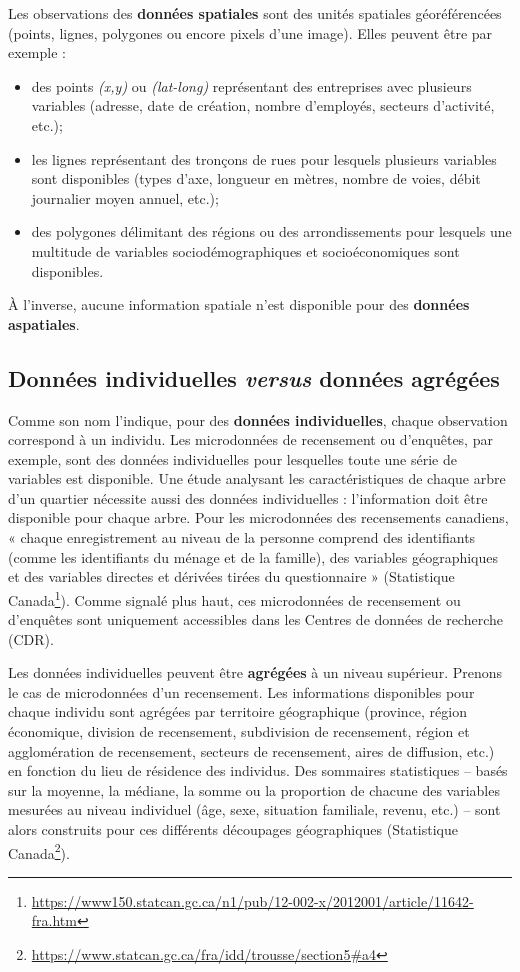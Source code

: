 \documentclass[
  11pt,
  french,
]{book}
\providecommand{\tightlist}{%
  \setlength{\itemsep}{0pt}\setlength{\parskip}{0pt}}
\renewcommand{\href}[2]{#2\footnote{\url{#1}}}
\begin{document}
Les observations des \textbf{données spatiales} sont des unités spatiales géoréférencées (points, lignes, polygones ou encore pixels d'une image). Elles peuvent être par exemple :

\begin{itemize}
\tightlist
\item
  des points \emph{(x,y)} ou \emph{(lat-long)} représentant des entreprises avec plusieurs variables (adresse, date de création, nombre d'employés, secteurs d'activité, etc.);
\item
  les lignes représentant des tronçons de rues pour lesquels plusieurs variables sont disponibles (types d'axe, longueur en mètres, nombre de voies, débit journalier moyen annuel, etc.);
\item
  des polygones délimitant des régions ou des arrondissements pour lesquels une multitude de variables sociodémographiques et socioéconomiques sont disponibles.
\end{itemize}

À l'inverse, aucune information spatiale n'est disponible pour des \textbf{données aspatiales}.

\hypertarget{sect0224}{%
\subsection{\texorpdfstring{Données individuelles \emph{versus} données agrégées}{Données individuelles versus données agrégées}}\label{sect0224}}

Comme son nom l'indique, pour des \textbf{données individuelles}, chaque observation correspond à un individu. Les microdonnées de recensement ou d'enquêtes, par exemple, sont des données individuelles pour lesquelles toute une série de variables est disponible. Une étude analysant les caractéristiques de chaque arbre d'un quartier nécessite aussi des données individuelles : l'information doit être disponible pour chaque arbre. Pour les microdonnées des recensements canadiens, « chaque enregistrement au niveau de la personne comprend des identifiants (comme les identifiants du ménage et de la famille), des variables géographiques et des variables directes et dérivées tirées du questionnaire » (\href{https://www150.statcan.gc.ca/n1/pub/12-002-x/2012001/article/11642-fra.htm}{Statistique Canada}). Comme signalé plus haut, ces microdonnées de recensement ou d'enquêtes sont uniquement accessibles dans les Centres de données de recherche (CDR).

Les données individuelles peuvent être \textbf{agrégées} à un niveau supérieur. Prenons le cas de microdonnées d'un recensement. Les informations disponibles pour chaque individu sont agrégées par territoire géographique (province, région économique, division de recensement, subdivision de recensement, région et agglomération de recensement, secteurs de recensement, aires de diffusion, etc.) en fonction du lieu de résidence des individus. Des sommaires statistiques -- basés sur la moyenne, la médiane, la somme ou la proportion de chacune des variables mesurées au niveau individuel (âge, sexe, situation familiale, revenu, etc.) -- sont alors construits pour ces différents découpages géographiques (\href{https://www.statcan.gc.ca/fra/idd/trousse/section5\#a4}{Statistique Canada}).
\end{document}
